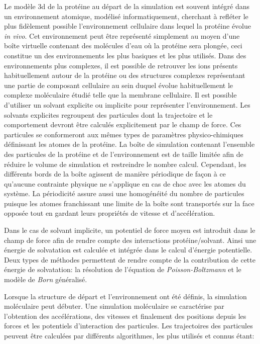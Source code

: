 Le modèle 3d de la protéine au départ de la simulation est souvent intégré dans un environnement atomique, modélisé informatiquement, cherchant à refléter le plus fidèlement possible l'environnement cellulaire dans lequel la protéine évolue \textit{in vivo}. Cet environnement peut être représenté simplement au moyen d'une boîte virtuelle contenant des molécules d'eau où la protéine sera plongée, ceci constitue un des environnements les plus basiques et les plus utilisés. Dans des environnements plus complexes, il est possible de retrouver les ions présents habituellement autour de la protéine ou des structures complexes représentant une partie de composant cellulaire au sein duquel évolue habituellement le complexe moléculaire étudié telle que la membrane cellulaire. Il est possible d'utiliser un solvant explicite ou implicite pour représenter l'environnement. Les solvants explicites regroupent des particules dont la trajectoire et le comportement devront être calculés explicitement par le champ de force. Ces particules se conformeront aux mêmes types de paramètres physico-chimiques définissant les atomes de la protéine. 
La boîte de simulation contenant l'ensemble des particules de la protéine et de l'environnement est de taille limitée afin de réduire le volume de simulation et restreindre le nombre calcul. Cependant, les différents bords de la boîte agissent de manière périodique de façon à ce qu'aucune contrainte physique ne s'applique en cas de choc avec les atomes du système. La périodicité assure aussi une homogénéité du nombre de particules puisque les atomes franchissant une limite de la boîte sont transportés sur la face opposée tout en gardant leurs propriétés de vitesse et d'accélération.

Dans le cas de solvant implicite, un potentiel de force moyen est introduit dans le champ de force afin de rendre compte des interactions protéine/solvant. Ainsi une énergie de solvatation est calculée et intégrée dans le calcul d'énergie potentielle. Deux types de méthodes permettent de rendre compte de la contribution de cette énergie de solvatation: la résolution de l'équation de \textit{Poisson-Boltzmann} et le modèle de \textit{Born} généralisé.

Lorsque la structure de départ et l'environnement ont été définis, la simulation moléculaire peut débuter. Une simulation moléculaire se caractérise par l'obtention des accélérations, des vitesses et finalement des positions depuis les forces et les potentiels d'interaction des particules. Les trajectoires des particules peuvent être calculées par différents algorithmes, les plus utilisés et connus étant:

